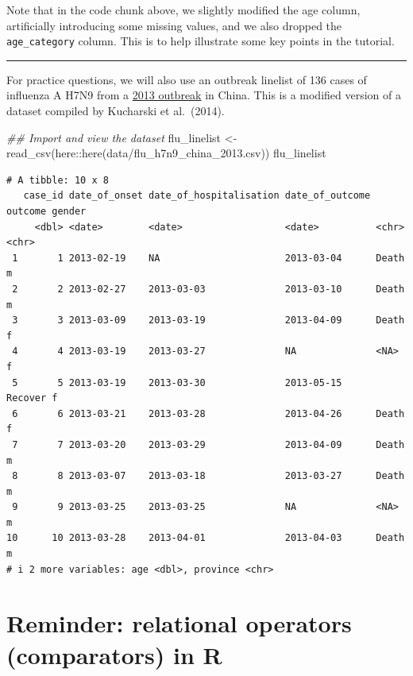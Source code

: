 \documentclass[
  letterpaper,
  DIV=11,
  numbers=noendperiod]{scrreprt}
\newenvironment{Shaded}{\begin{snugshade}}{\end{snugshade}}
\newcommand{\DocumentationTok}[1]{\textcolor[rgb]{0.37,0.37,0.37}{\textit{#1}}}
\newcommand{\FunctionTok}[1]{\textcolor[rgb]{0.28,0.35,0.67}{#1}}
\newcommand{\NormalTok}[1]{\textcolor[rgb]{0.00,0.23,0.31}{#1}}
\newcommand{\OtherTok}[1]{\textcolor[rgb]{0.00,0.23,0.31}{#1}}
\newcommand{\SpecialCharTok}[1]{\textcolor[rgb]{0.37,0.37,0.37}{#1}}
\newcommand{\StringTok}[1]{\textcolor[rgb]{0.13,0.47,0.30}{#1}}
\begin{document}
Note that in the code chunk above, we slightly modified the age column,
artificially introducing some missing values, and we also dropped the
\texttt{age\_category} column. This is to help illustrate some key
points in the tutorial.

\begin{center}\rule{0.5\linewidth}{0.5pt}\end{center}

For practice questions, we will also use an outbreak linelist of 136
cases of influenza A H7N9 from a
\href{https://en.wikipedia.org/wiki/Influenza_A_virus_subtype_H7N9\#Reported_cases_in_2013}{2013
outbreak} in China. This is a modified version of a dataset compiled by
Kucharski et al.~(2014).

\begin{Shaded}
\begin{Highlighting}[]
\DocumentationTok{\#\# Import and view the dataset}
\NormalTok{flu\_linelist }\OtherTok{\textless{}{-}} \FunctionTok{read\_csv}\NormalTok{(here}\SpecialCharTok{::}\FunctionTok{here}\NormalTok{(}\StringTok{\textquotesingle{}data/flu\_h7n9\_china\_2013.csv\textquotesingle{}}\NormalTok{))}
\NormalTok{flu\_linelist}
\end{Highlighting}
\end{Shaded}

\begin{verbatim}
# A tibble: 10 x 8
   case_id date_of_onset date_of_hospitalisation date_of_outcome outcome gender
     <dbl> <date>        <date>                  <date>          <chr>   <chr> 
 1       1 2013-02-19    NA                      2013-03-04      Death   m     
 2       2 2013-02-27    2013-03-03              2013-03-10      Death   m     
 3       3 2013-03-09    2013-03-19              2013-04-09      Death   f     
 4       4 2013-03-19    2013-03-27              NA              <NA>    f     
 5       5 2013-03-19    2013-03-30              2013-05-15      Recover f     
 6       6 2013-03-21    2013-03-28              2013-04-26      Death   f     
 7       7 2013-03-20    2013-03-29              2013-04-09      Death   m     
 8       8 2013-03-07    2013-03-18              2013-03-27      Death   m     
 9       9 2013-03-25    2013-03-25              NA              <NA>    m     
10      10 2013-03-28    2013-04-01              2013-04-03      Death   m     
# i 2 more variables: age <dbl>, province <chr>
\end{verbatim}

\hypertarget{reminder-relational-operators-comparators-in-r}{%
\section{Reminder: relational operators (comparators) in
R}\label{reminder-relational-operators-comparators-in-r}}
\end{document}

